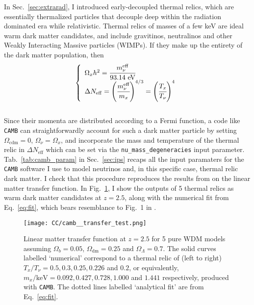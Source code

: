 In Sec.~\ref{sec:extrarad}, I introduced early-decoupled thermal relics, which are essentially thermalized particles that decouple deep within the radiation dominated era while relativistic. Thermal relics of masses of a few keV are ideal warm dark matter candidates, and include gravitinos, neutralinos and other Weakly Interacting Massive particles (WIMPs). If they make up the entirety of the dark matter population, then \\
\begin{equation}
\left\{ 
\begin{array}{l}
\Omega_x h^2 = \cfrac{m_\nu^{\mathrm{eff}}}{93.14~ \mathrm{eV}} \\
\Delta N_{\mathrm{eff}} = \left( \cfrac{m_\nu^{\mathrm{eff}}}{m_x} \right)^{4/3} = \left( \cfrac{T_x}{T_\nu} \right)^4
\end{array}
\right.
\end{equation} \\ Since their momenta are distributed according to a Fermi function, a code like \texttt{CAMB} can straightforwardly account for such a dark matter particle by setting $\Omega_{\mathrm{cdm}} = 0$, $\Omega_\nu = \Omega_x$, and incorporate the mass and temperature of the thermal relic in $\Delta N_{\mathrm{eff}}$ which can be set via the \texttt{nu\_mass\_degeneracies} input parameter. Tab.~\ref{tab:camb_param} in Sec.~\ref{sec:ips} recaps all the input paramaters for the \texttt{CAMB} software I use to model neutrinos and, in this specific case, thermal relic dark matter. I check that this procedure reproduces the results from \cite{VLH08a} on the linear matter transfer function. In Fig.~\ref{fig:pk_lin_x}, I show the outputs of 5 thermal relics as warm dark matter candidates at $z=2.5$, along with the numerical fit from Eq.~\ref{eq:fit}, which bears resemblance to Fig.~1 in \cite{VLH08a}. \\


\begin{figure}
\begin{center}
\texttt{[image: CC/camb\_\_transfer\_test.png]}
\caption{Linear matter transfer function at $z=2.5$ for 5 pure WDM models assuming $\Omega_b=0.05$, $\Omega_{\mathrm{dm}} = 0.25$ and $\Omega_\Lambda = 0.7$. The solid curves labelled `numerical' correspond to a thermal relic of (left to right) $T_x/T_\nu = 0.5, 0.3, 0.25, 0.226$ and $0.2$, or equivalently, $m_x/\mathrm{keV} = 0.092, 0.427, 0.728, 1.000$ and $1.441$ respectively, produced with \texttt{CAMB}. The dotted lines labelled `analytical fit' are from Eq.~\ref{eq:fit}.}
\label{fig:pk_lin_x}
\end{center}
\end{figure}


